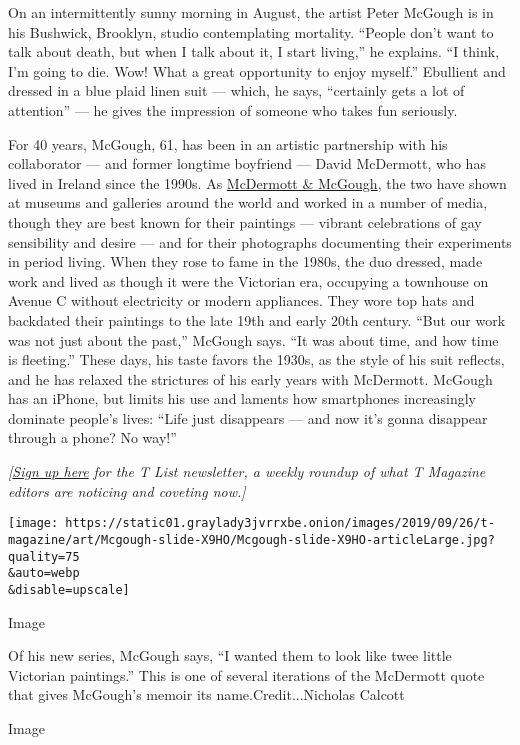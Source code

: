 On an intermittently sunny morning in August, the artist Peter McGough
is in his Bushwick, Brooklyn, studio contemplating mortality. ``People
don't want to talk about death, but when I talk about it, I start
living,'' he explains. ``I think, I'm going to die. Wow! What a great
opportunity to enjoy myself.'' Ebullient and dressed in a blue plaid
linen suit --- which, he says, ``certainly gets a lot of attention'' ---
he gives the impression of someone who takes fun seriously.

For 40 years, McGough, 61, has been in an artistic partnership with his
collaborator --- and former longtime boyfriend --- David McDermott, who
has lived in Ireland since the 1990s. As
\href{http://www.mcdermottandmcgough.com/}{McDermott \& McGough}, the
two have shown at museums and galleries around the world and worked in a
number of media, though they are best known for their paintings ---
vibrant celebrations of gay sensibility and desire --- and for their
photographs documenting their experiments in period living. When they
rose to fame in the 1980s, the duo dressed, made work and lived as
though it were the Victorian era, occupying a townhouse on Avenue C
without electricity or modern appliances. They wore top hats and
backdated their paintings to the late 19th and early 20th century. ``But
our work was not just about the past,'' McGough says. ``It was about
time, and how time is fleeting.'' These days, his taste favors the
1930s, as the style of his suit reflects, and he has relaxed the
strictures of his early years with McDermott. McGough has an iPhone, but
limits his use and laments how smartphones increasingly dominate
people's lives: ``Life just disappears --- and now it's gonna disappear
through a phone? No way!''

\emph{{[}}\href{https://www.nytimes3xbfgragh.onion/newsletters/t-list?module=inline}{\emph{Sign
up here}} \emph{for the T List newsletter, a weekly roundup of what T
Magazine editors are noticing and coveting now.{]}}

\texttt{[image: https://static01.graylady3jvrrxbe.onion/images/2019/09/26/t-magazine/art/Mcgough-slide-X9HO/Mcgough-slide-X9HO-articleLarge.jpg?quality=75\\\&auto=webp\\\&disable=upscale]}

Image

Of his new series, McGough says, ``I wanted them to look like twee
little Victorian paintings.'' This is one of several iterations of the
McDermott quote that gives McGough's memoir its name.Credit...Nicholas
Calcott

Image

